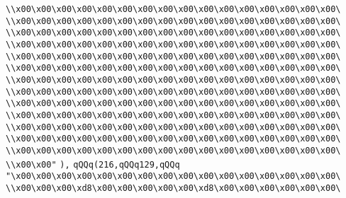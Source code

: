 \verb|\\x00\x00\x00\x00\x00\x00\x00\x00\x00\x00\x00\x00\x00\x00\x00\x00\|\newline
\verb|\\x00\x00\x00\x00\x00\x00\x00\x00\x00\x00\x00\x00\x00\x00\x00\x00\|\newline
\verb|\\x00\x00\x00\x00\x00\x00\x00\x00\x00\x00\x00\x00\x00\x00\x00\x00\|\newline
\verb|\\x00\x00\x00\x00\x00\x00\x00\x00\x00\x00\x00\x00\x00\x00\x00\x00\|\newline
\verb|\\x00\x00\x00\x00\x00\x00\x00\x00\x00\x00\x00\x00\x00\x00\x00\x00\|\newline
\verb|\\x00\x00\x00\x00\x00\x00\x00\x00\x00\x00\x00\x00\x00\x00\x00\x00\|\newline
\verb|\\x00\x00\x00\x00\x00\x00\x00\x00\x00\x00\x00\x00\x00\x00\x00\x00\|\newline
\verb|\\x00\x00\x00\x00\x00\x00\x00\x00\x00\x00\x00\x00\x00\x00\x00\x00\|\newline
\verb|\\x00\x00\x00\x00\x00\x00\x00\x00\x00\x00\x00\x00\x00\x00\x00\x00\|\newline
\verb|\\x00\x00\x00\x00\x00\x00\x00\x00\x00\x00\x00\x00\x00\x00\x00\x00\|\newline
\verb|\\x00\x00\x00\x00\x00\x00\x00\x00\x00\x00\x00\x00\x00\x00\x00\x00\|\newline
\verb|\\x00\x00\x00\x00\x00\x00\x00\x00\x00\x00\x00\x00\x00\x00\x00\x00\|\newline
\verb|\\x00\x00\x00\x00\x00\x00\x00\x00\x00\x00\x00\x00\x00\x00\x00\x00\|\newline
\verb|\\x00\x00"|\newline
\verb|),|\newline
\verb|qQQq(216,qQQq129,qQQq|\newline
\verb|"\x00\x00\x00\x00\x00\x00\x00\x00\x00\x00\x00\x00\x00\x00\x00\x00\|\newline
\verb|\\x00\x00\x00\xd8\x00\x00\x00\x00\x00\xd8\x00\x00\x00\x00\x00\x00\|\newline
